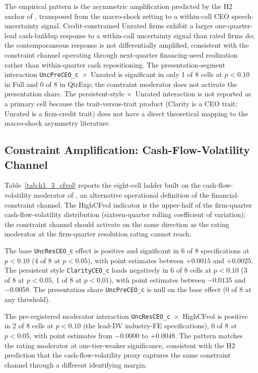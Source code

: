 The empirical pattern is the asymmetric amplification predicted by the H2 anchor of , transposed from the macro-shock setting to a within-call CEO speech-uncertainty signal. Credit-constrained Unrated firms exhibit a larger one-quarter-lead cash-buildup response to a within-call uncertainty signal than rated firms do; the contemporaneous response is not differentially amplified, consistent with the constraint channel operating through next-quarter financing-need realization rather than within-quarter cash repositioning. The presentation-segment interaction \texttt{UncPreCEO\_c}~$\times$~Unrated is significant in only 1 of 8 cells at $p<0.10$ in Full and 0 of 8 in QtrExp; the constraint moderator does not activate the presentation share. The persistent-style $\times$~Unrated interaction is not reported as a primary cell because the trait-versus-trait product (Clarity is a CEO trait; Unrated is a firm-credit trait) does not have a direct theoretical mapping to the macro-shock asymmetry literature.

\subsection{Constraint Amplification: Cash-Flow-Volatility Channel}
\label{sec:main:cfvol}

Table~\ref{tab:h1_3_cfvol} reports the eight-cell ladder built on the cash-flow-volatility moderator of , an alternative operational definition of the financial-constraint channel. The HighCFvol indicator is the upper-half of the firm-quarter cash-flow-volatility distribution (sixteen-quarter rolling coefficient of variation); the constraint channel should activate on the same direction as the rating moderator at the firm-quarter resolution rating cannot reach.

The base \texttt{UncResCEO\_c} effect is positive and significant in 6 of 8 specifications at $p<0.10$ (4 of 8 at $p<0.05$), with point estimates between $+0.0015$ and $+0.0025$. The persistent style \texttt{ClarityCEO\_c} loads negatively in 6 of 8 cells at $p<0.10$ (3 of 8 at $p<0.05$, 1 of 8 at $p<0.01$), with point estimates between $-0.0135$ and $-0.0058$. The presentation share \texttt{UncPreCEO\_c} is null on the base effect (0 of 8 at any threshold).

The pre-registered moderator interaction \texttt{UncResCEO\_c}~$\times$~HighCFvol is positive in 2 of 8 cells at $p<0.10$ (the lead-DV industry-FE specifications), 0 of 8 at $p<0.05$, with point estimates from $-0.0000$ to $+0.0048$. The pattern matches the rating moderator at one-tier-weaker significance, consistent with the H2 prediction that the cash-flow-volatility proxy captures the same constraint channel through a different identifying margin.

